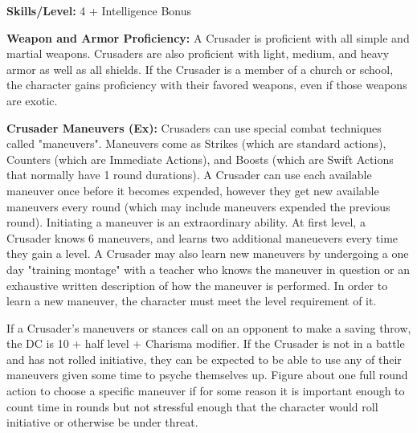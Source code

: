 \textbf{Skills/Level:} 4 + Intelligence Bonus

\goodbab{}
\goodfor{}
\poorref{}
\poorwil{}

\begin{extraclasstable}{}
\end{extraclasstable}

\classfeatures

\textbf{Weapon and Armor Proficiency:} A Crusader is proficient with all simple and martial weapons. Crusaders are also proficient with light, medium, and heavy armor as well as all shields. If the Crusader is a member of a church or school, the character gains proficiency with their favored weapons, even if those weapons are exotic.

\textbf{Crusader Maneuvers (Ex):} Crusaders can use special combat techniques called "maneuvers". Maneuvers come as Strikes (which are standard actions), Counters (which are Immediate Actions), and Boosts (which are Swift Actions that normally have 1 round durations). A Crusader can use each available maneuver once before it becomes expended, however they get new available maneuvers every round (which may include maneuvers expended the previous round). Initiating a maneuver is an extraordinary ability. At first level, a Crusader knows 6 maneuvers, and learns two additional maneuevers every time they gain a level. A Crusader may also learn new maneuvers by undergoing a one day "training montage" with a teacher who knows the maneuver in question or an exhaustive written description of how the maneuver is performed. In order to learn a new maneuver, the character must meet the level requirement of it.

If a Crusader's maneuvers or stances call on an opponent to make a saving throw, the DC is 10 + half level + Charisma modifier. If the Crusader is not in a battle and has not rolled initiative, they can be expected to be able to use any of their maneuvers given some time to psyche themselves up. Figure about one full round action to choose a specific maneuver if for some reason it is important enough to count time in rounds but not stressful enough that the character would roll initiative or otherwise be under threat.

